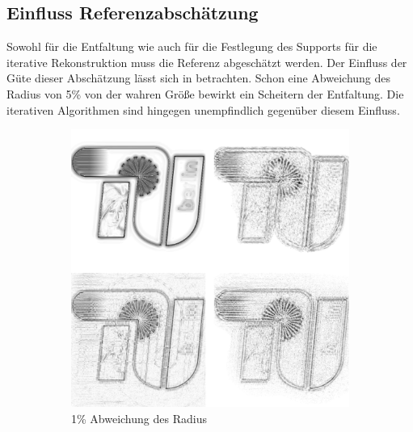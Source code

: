 \subsection{Einfluss Referenzabschätzung}
Sowohl für die Entfaltung wie auch für die Festlegung des Supports für die iterative Rekonstruktion muss die Referenz abgeschätzt werden. Der Einfluss der Güte dieser Abschätzung lässt sich in  betrachten. Schon eine Abweichung des Radius von 5\% von der wahren Größe bewirkt ein Scheitern der Entfaltung. Die iterativen Algorithmen sind hingegen unempfindlich gegenüber diesem Einfluss.
\begin{figure}
	\begin{subfigure}[b]{0.45\textwidth}
		\includegraphics[width=\textwidth]{images/recon2d-mask16bit16error01.png}
		\caption{1\% Abweichung des Radius}
	\end{subfigure}
	\hspace*{\fill}
	\begin{subfigure}[b]{0.45\textwidth}

\end{subfigure}
\end{figure}
